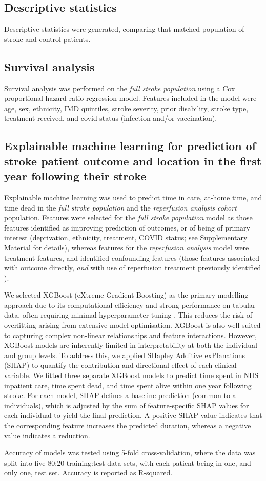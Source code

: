 \subsection{Descriptive statistics}

Descriptive statistics were generated, comparing that matched population of stroke and control patients. 


\subsection{Survival analysis}

Survival analysis was performed on the \textit{full stroke population} using a Cox proportional hazard ratio regression model. Features included in the model were age, sex, ethnicity, IMD quintiles, stroke severity, prior disability, stroke type, treatment received, and covid status (infection and/or vaccination).

\subsection{Explainable machine learning for prediction of stroke patient outcome and location in the first year following their stroke}

Explainable machine learning was used to predict time in care, at-home time, and time dead in the \textit{full stroke population} and the \textit{reperfusion analysis cohort} population. Features were selected for the \textit{full stroke population} model as those features identified as improving prediction of outcomes, or of being of primary interest (deprivation, ethnicity, treatment, COVID status; see Supplementary Material for details), whereas features for the \textit{reperfusion analysis} model were treatment features, and identified confounding features (those features associated with outcome directly, \textit{and} with use of reperfusion treatment previously identified \cite{pearn_thrombolysis_2026}).

We selected XGBoost (eXtreme Gradient Boosting) \cite{chen_xgboost_2016} as the primary modelling approach due to its computational efficiency and strong performance on tabular data, often requiring minimal hyperparameter tuning \cite{shwartz-ziv_tabular_2022}. This reduces the risk of overfitting arising from extensive model optimisation. XGBoost is also well suited to capturing complex non-linear relationships and feature interactions. However, XGBoost models are inherently limited in interpretability at both the individual and group levels. To address this, we applied SHapley Additive exPlanations (SHAP) \cite{lundberg_consistent_2019} to quantify the contribution and directional effect of each clinical variable. We fitted three separate XGBoost models to predict time spent in NHS inpatient care, time spent dead, and time spent alive within one year following stroke. For each model, SHAP defines a baseline prediction (common to all individuals), which is adjusted by the sum of feature-specific SHAP values for each individual to yield the final prediction. A positive SHAP value indicates that the corresponding feature increases the predicted duration, whereas a negative value indicates a reduction.

Accuracy of models was tested using 5-fold cross-validation, where the data was split into five 80:20 training:test data sets, with each patient being in one, and only one, test set.  Accuracy is reported as R-squared.